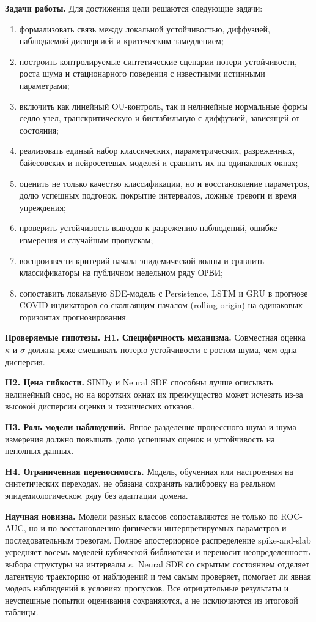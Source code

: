 \documentclass[12pt,a4paper]{article}
\numberwithin{table}{section}
\numberwithin{figure}{section}
\begin{document}
\textbf{Задачи работы.} Для достижения цели решаются следующие задачи:

\begin{enumerate}
\item формализовать связь между локальной устойчивостью, диффузией,
наблюдаемой дисперсией и критическим замедлением;
\item построить контролируемые синтетические сценарии потери устойчивости,
роста шума и стационарного поведения с известными истинными параметрами;
\item включить как линейный OU-контроль, так и нелинейные нормальные формы
седло-узел, транскритическую и бистабильную с диффузией, зависящей от состояния;
\item реализовать единый набор классических, параметрических, разреженных,
байесовских и нейросетевых моделей и сравнить их на одинаковых окнах;
\item оценить не только качество классификации, но и восстановление параметров,
долю успешных подгонок, покрытие интервалов, ложные тревоги и время упреждения;
\item проверить устойчивость выводов к разрежению наблюдений, ошибке измерения
и случайным пропускам;
\item воспроизвести критерий начала эпидемической волны и сравнить
классификаторы на публичном недельном ряду ОРВИ;
\item сопоставить локальную SDE-модель с Persistence, LSTM и GRU в прогнозе
COVID-индикаторов со скользящим началом (rolling origin) на одинаковых
горизонтах прогнозирования.
\end{enumerate}

\textbf{Проверяемые гипотезы. H1. Специфичность механизма.} Совместная оценка $\kappa$ и $\sigma$
должна реже смешивать потерю устойчивости с ростом шума, чем одна дисперсия.

\textbf{H2. Цена гибкости.} SINDy и Neural SDE способны лучше описывать
нелинейный снос, но на коротких окнах их преимущество может исчезать из-за
высокой дисперсии оценки и технических отказов.

\textbf{H3. Роль модели наблюдений.} Явное разделение процессного шума и
шума измерения должно повышать долю успешных оценок и устойчивость на неполных
данных.

\textbf{H4. Ограниченная переносимость.} Модель, обученная или настроенная на
синтетических переходах, не обязана сохранять калибровку на реальном
эпидемиологическом ряду без адаптации домена.

\textbf{Научная новизна.} Модели разных классов сопоставляются не только по
ROC-AUC, но и по восстановлению физически интерпретируемых параметров и
последовательным тревогам. Полное апостериорное распределение
spike-and-slab усредняет восемь моделей кубической библиотеки и переносит
неопределенность выбора структуры на интервалы $\kappa$. Neural SDE со скрытым
состоянием отделяет латентную траекторию от наблюдений и тем самым проверяет,
помогает ли явная модель наблюдений в условиях пропусков. Все отрицательные
результаты и неуспешные попытки оценивания сохраняются, а не исключаются из
итоговой таблицы.
\end{document}
